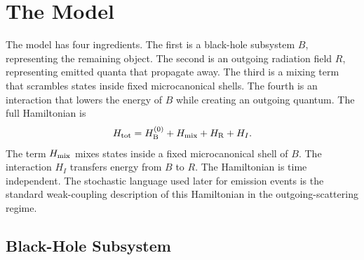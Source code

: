 \documentclass[12pt]{article}
\begin{document}
\section{The Model}

The model has four ingredients.  The first is a black-hole subsystem $B$,
representing the remaining object.  The second is an outgoing
radiation field $R$, representing emitted quanta that propagate away.  The
third is a mixing term that scrambles states inside fixed microcanonical
shells.  The fourth is an interaction that lowers the energy of $B$ while
creating an outgoing quantum.  The full Hamiltonian is
\begin{equation}
    H_{\rm tot}=H_{\rm B}^{(0)}+H_{\rm mix}+H_{\rm R}+H_I.
\end{equation}
The term $H_{\rm mix}$ mixes states inside a fixed microcanonical shell of
$B$.  The interaction $H_I$ transfers energy from $B$ to $R$.
The Hamiltonian is time independent.  The stochastic language used later for
emission events is the standard weak-coupling description of this Hamiltonian
in the outgoing-scattering regime.

\subsection{Black-Hole Subsystem}
\end{document}
